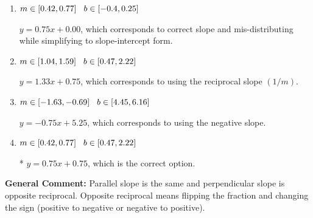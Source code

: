 \documentclass{extbook}[14pt]
\begin{document}
\begin{enumerate}
{\begin{enumerate}[label=\Alph*.]
 $y = 0.75x - 0.75$, which corresponds to using the correct slope and getting the negative $y$-intercept.
\item \( m \in [0.42, 0.77] \hspace*{3mm} b \in [-0.4, 0.25] \)

 $y = 0.75x + 0.00$, which corresponds to correct slope and mis-distributing while simplifying to slope-intercept form.
\item \( m \in [1.04, 1.59] \hspace*{3mm} b \in [0.47, 2.22] \)

 $y = 1.33x + 0.75$, which corresponds to using the reciprocal slope $(1/m)$.
\item \( m \in [-1.63, -0.69] \hspace*{3mm} b \in [4.45, 6.16] \)

 $y = -0.75x + 5.25$, which corresponds to using the negative slope.
\item \( m \in [0.42, 0.77] \hspace*{3mm} b \in [0.47, 2.22] \)

* $y = 0.75x + 0.75$, which is the correct option.
\end{enumerate}

\textbf{General Comment:} Parallel slope is the same and perpendicular slope is opposite reciprocal. Opposite reciprocal means flipping the fraction and changing the sign (positive to negative or negative to positive).
}
\end{enumerate}
\end{document}
